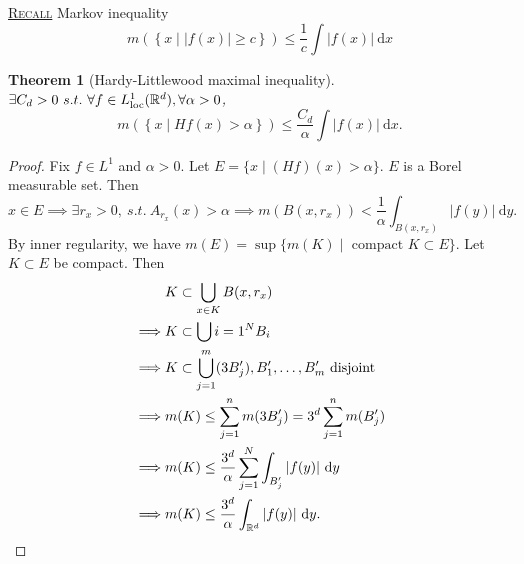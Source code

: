 \documentclass{report}
\newcommand{\R}{\mathbb{R}}
\newcommand{\st}{\ s.t.\ }
\newcommand{\df}{\ \mathrm{d}}
\newcommand{\fancyem}[1]{\underline{\textsc{#1}}}
\newtheorem{theorem}{Theorem}[chapter]
\theoremstyle{definition}
\theoremstyle{remark}
\begin{document}
\fancyem{Recall} Markov inequality
\[
	m\left(\left\lbrace x \mid |f(x)| \geq c \right\rbrace\right) \leq \frac{1}{c}\int |f(x)| \df x
\]
\begin{theorem}[Hardy-Littlewood maximal inequality] $\exists C_d > 0 \st \forall f \in L^1_{\textup{loc}}(\R^d), \forall \alpha > 0$,
	\[
		m\left(\left\lbrace x \mid Hf(x) > \alpha \right\rbrace\right) \leq \frac{C_d}{\alpha}\int |f(x)| \df x.
	\]
\end{theorem}
\begin{proof}
	Fix $f \in L^1$ and $\alpha > 0$. Let $E = \{x \mid (Hf)(x) > \alpha\}$. $E$ is a Borel measurable set. Then
	\[\displaystyle x \in E \implies \exists r_x > 0, \st A_{r_x}(x) > \alpha \implies m(B(x, r_x)) < \frac{1}{\alpha} \int_{B(x, r_x)}|f(y)| \df y.\]
	By inner regularity, we have $m(E) = \sup \{m(K) \mid \text{ compact } K \subset E\}$. Let $K \subset E$ be compact. Then 
	\begin{align*}
		& K \subset \bigcup_{x \in K} B(x, r_x) \\
		\implies & K \subset \bigcup{i=1}^N B_i \\
		\implies & K \subset \bigcup_{j=1}^m (3B_j'), B_1', \ldots, B_m' \text{ disjoint} \\
		\implies & m(K) \leq \sum_{j=1}^n m(3B'_j) = 3^d\sum_{j=1}^n m(B'_j) \\
		\implies & m(K) \leq \frac{3^d}{\alpha} \sum_{j=1}^N \int_{B'_j} |f(y)| \df y \\
		\implies & m(K) \leq \frac{3^d}{\alpha} \int_{\R^d} |f(y)| \df y. \qedhere
	\end{align*}
\end{proof}
\end{document}
